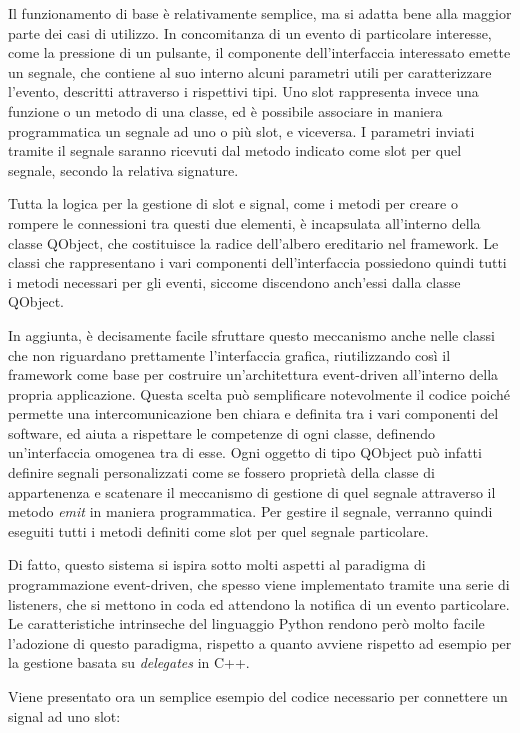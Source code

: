 \documentclass[12pt]{toptesi}
\begin{document}
Il funzionamento di base è relativamente semplice, ma si adatta bene alla maggior parte dei casi di utilizzo. In concomitanza di un evento di particolare interesse, come la pressione di un pulsante, il componente dell'interfaccia interessato emette un segnale, che contiene al suo interno alcuni parametri utili per caratterizzare l'evento, descritti attraverso i rispettivi tipi. Uno slot rappresenta invece una funzione o un metodo di una classe, ed è possibile associare in maniera programmatica un segnale ad uno o più slot, e viceversa. I parametri inviati tramite il segnale saranno ricevuti dal metodo indicato come slot per quel segnale, secondo la relativa signature. 

Tutta la logica per la gestione di slot e signal, come i metodi per creare o rompere le connessioni tra questi due elementi, è incapsulata all'interno della classe QObject, che costituisce la radice dell'albero ereditario nel framework. Le classi che rappresentano i vari componenti dell'interfaccia possiedono quindi tutti i metodi necessari per gli eventi, siccome discendono anch'essi dalla classe QObject. 

In aggiunta, è decisamente facile sfruttare questo meccanismo anche nelle classi che non riguardano prettamente l'interfaccia grafica, riutilizzando così il framework come base per costruire un'architettura event-driven all'interno della propria applicazione. Questa scelta può semplificare notevolmente il codice poiché permette una intercomunicazione ben chiara e definita tra i vari componenti del software, ed aiuta a rispettare le competenze di ogni classe, definendo un'interfaccia omogenea tra di esse. Ogni oggetto di tipo QObject può infatti definire segnali personalizzati come se fossero proprietà della classe di appartenenza e scatenare il meccanismo di gestione di quel segnale attraverso il metodo \emph{emit} in maniera programmatica. Per gestire il segnale, verranno quindi eseguiti tutti i metodi definiti come slot per quel segnale particolare.

Di fatto, questo sistema si ispira sotto molti aspetti al paradigma di programmazione event-driven, che spesso viene implementato tramite una serie di listeners, che si mettono in coda ed attendono la notifica di un evento particolare. Le caratteristiche intrinseche del linguaggio Python rendono però molto facile l'adozione di questo paradigma, rispetto a quanto avviene rispetto ad esempio per la gestione basata su \emph{delegates} in C++. 

Viene presentato ora un semplice esempio del codice necessario per connettere un signal ad uno slot:
\end{document}
